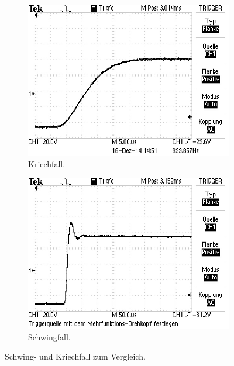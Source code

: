 \begin{figure}[hbp]
	\centering
	\begin{subfigure}{0.4\textwidth}
		\includegraphics[width=\textwidth]{Bilder/Kriechfall1.JPG}
		\caption{Kriechfall.}
	\end{subfigure}
	\begin{subfigure}{0.4\textwidth}
		\includegraphics[width=\textwidth]{Bilder/Schwingfall.JPG}
		\caption{Schwingfall.}
	\end{subfigure}
	\caption{Schwing- und Kriechfall zum Vergleich.}
	\label{fig:faelle}
\end{figure}
\newpage
